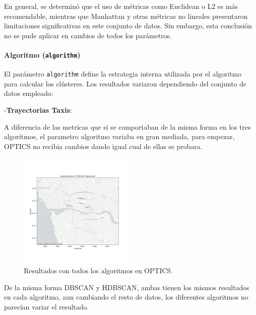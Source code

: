 \FloatBarrier

En general, se determinó que el uso de métricas como Euclidean o L2 es más recomendable, mientras que Manhattan y otras métricas no lineales presentaron limitaciones significativas en este conjunto de datos. Sin embargo, esta conclusión no se pude aplicar en cambios de todos los parámetros.


\paragraph{Algoritmo (\texttt{algorithm})}

El parámetro \texttt{algorithm} define la estrategia interna utilizada por el algoritmo para calcular los clústeres. Los resultados variaron dependiendo del conjunto de datos empleado:

-\textbf{Trayectorias Taxis}:

A diferencia de las metricas que si se comportaban de la misma forma en los tres algoritmos, el parametro algoritmo variaba en gran mediada, para empezar, OPTICS no recibia cambios dando igual cual de ellas se probara.

\begin{figure}[h!]
    \centering
    \includegraphics[width=0.5\textwidth]{img/Taxis/map_optics_auto.png}
    \caption{Resultados con todos los algoritmos en OPTICS.}
    \label{fig:taxis_algorith_optics}
\end{figure}

\FloatBarrier

De la misma forma DBSCAN y HDBSCAN, ambas tienen los mismos resultados en cada algoritmo, aun cambiando el resto de datos, los diferentes algoritmos no parecían variar el resultado.

